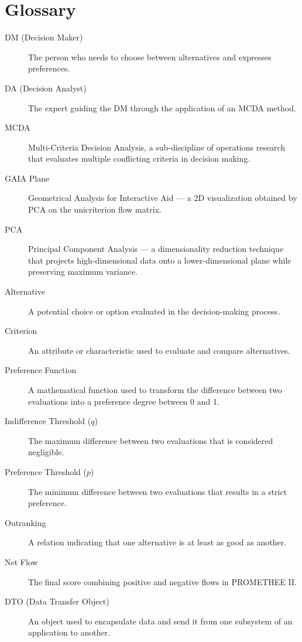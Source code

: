 \documentclass[12pt,a4paper,oneside]{report}
\begin{document}
\chapter*{Glossary}
\begin{description}
    \item[DM (Decision Maker)] The person who needs to choose between alternatives and expresses preferences.
    \item[DA (Decision Analyst)] The expert guiding the DM through the application of an MCDA method.
    \item[MCDA] Multi-Criteria Decision Analysis, a sub-discipline of operations research that evaluates multiple conflicting criteria in decision making.
    \item[GAIA Plane] Geometrical Analysis for Interactive Aid --- a 2D visualization obtained by PCA on the unicriterion flow matrix.
    \item[PCA] Principal Component Analysis --- a dimensionality reduction technique that projects high-dimensional data onto a lower-dimensional plane while preserving maximum variance.
    \item[Alternative] A potential choice or option evaluated in the decision-making process.
    \item[Criterion] An attribute or characteristic used to evaluate and compare alternatives.
    \item[Preference Function] A mathematical function used to transform the difference between two evaluations into a preference degree between 0 and 1.
    \item[Indifference Threshold ($q$)] The maximum difference between two evaluations that is considered negligible.
    \item[Preference Threshold ($p$)] The minimum difference between two evaluations that results in a strict preference.
    \item[Outranking] A relation indicating that one alternative is at least as good as another.
    \item[Net Flow] The final score combining positive and negative flows in PROMETHEE II.
    \item[DTO (Data Transfer Object)] An object used to encapsulate data and send it from one subsystem of an application to another.
\end{description}
\cleardoublepage
{}
\end{document}
